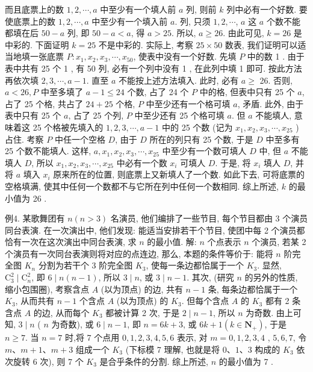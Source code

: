 而且底票上的数 $1,2, \cdots, a$ 中至少有一个填人前 $a$ 列, 则前 $k$ 列中必有一个好数.
要使底票上的数 $1,2, \cdots, a$ 中至少有一个填入前 $a$. 列, 只须 $1,2, \cdots$, $a$ 这 $a$ 个数不能都填在后 $50-a$ 列, 即 $50-a<a$, 得 $a>25$. 所以, $a \geqslant 26$. 由此可见, $k=26$ 是中彩的.
下面证明 $k=25$ 不是中彩的.
实际上, 考察 $25 \times 50$ 数表, 我们证明可以适当地填一张底票 $P: x_1, x_2, x_3, \cdots, x_{50}$, 使表中没有一个好数.
先填 $P$ 中的数 1 . 由于表中共有 25 个 1 , 有 50 列, 必有一个列中没有 1 , 在此列中填 1 即可.
按此方法再依次填 $2,3, \cdots, a-1$. 直至 $a$ 不能按上述方法填入.
此时, 必有 $a \geqslant$ 26. 否则, $a<26, P$ 中至多填了 $a-1 \leqslant 24$ 个数, 占了 24 个 $P$ 中的格, 但表中只有 25 个 $a$, 占了 25 个格, 共占了 $24+25$ 个格, $P$ 中至少还有一个格可填 $a$, 矛盾.
此外, 由于表中只有 25 个 $a$, 占了 25 个列, $P$ 中至少还有 25 个格可填 $a$. 但 $a$ 不能填人, 意味着这 25 个格被先填入的 $1,2,3, \cdots, a-1$ 中的 25 个数 (记为 $x_1, x_2, x_3, \cdots, x_{25}$ ) 占住.
考察 $P$ 中任一个空格 $D$, 由于 $D$ 所在的列只有 25 个数, 于是 $D$ 中至多有 25 个数不能填人.
这样, $a, x_1, x_2, x_3, \cdots, x_{25}$ 中至少有一个数可填人 $D$ 中, 但 $a$ 不能填人 $D$, 所以 $x_1, x_2, x_3, \cdots, x_{25}$ 中必有一个数 $x_i$ 可填人 $D$. 于是, 将 $x_i$ 填人 $D$, 并将 $a$ 填入 $x_i$ 原来所在的位置, 则底票上又新填人了一个数.
如此下去, 可将底票的空格填满, 使其中任何一个数都不与它所在列中任何一个数相同.
综上所述, $k$ 的最小值为 26 .



例4. 某歌舞团有 $n(n>3)$ 名演员, 他们编排了一些节目, 每个节目都由 3 个演员同台表演.
在一次演出中, 他们发现: 能适当安排若干个节目, 使团中每 2 个演员都恰有一次在这次演出中同台表演, 求 $n$ 的最小值.
解: $n$ 个点表示 $n$ 个演员, 若某 2 个演员有一次同台表演则将对应的点连边, 那么, 本题的条件等价于: 能将 $n$ 阶完全图 $K_n$ 分割为若干个 3 阶完全图 $K_3$, 使每一条边都恰属于一个 $K_3$.
显然, $\mathrm{C}_3^2 \mid \mathrm{C}_n^2$, 即 $6 \mid n(n-1)$, 所以 $3 \mid n$, 或 $3 \mid n-1$.
其次, (研究 $n$ 的另外的性质, 缩小包围圈), 考察含点 $A$ (以为顶点) 的边,
共有 $n-1$ 条, 每条边都恰属于一个 $K_3$, 从而共有 $n-1$ 个含点 $A$ (以为顶点) 的 $K_3$. 但每个含点 $A$ 的 $K_3$ 都有 2 条含点 $A$ 的边, 从而每个 $K_3$ 都被计算 2 次, 于是 $2 \mid n-1$, 所以 $n$ 为奇数.
由上可知, $3 \mid n$ ( $n$ 为奇数), 或 $6 \mid n-1$, 即 $n=6 k+3$, 或 $6 k+1\left(k \in \mathbf{N}_{+}\right)$, 于是 $n \geqslant 7$.
当 $n=7$ 时,将 7 个点用 $0,1,2,3,4,5,6$ 表示, 对 $m=0,1,2,3,4$ , $5,6,7$, 令 $m 、 m+1 、 m+3$ 组成一个 $K_3$ (下标模 7 理解, 也就是将 $0 、 1 、 3$ 构成的 $K_3$ 依次旋转 6 次), 则 7 个 $K_3$ 是合乎条件的分割.
综上所述, $n$ 的最小值为 7 .



